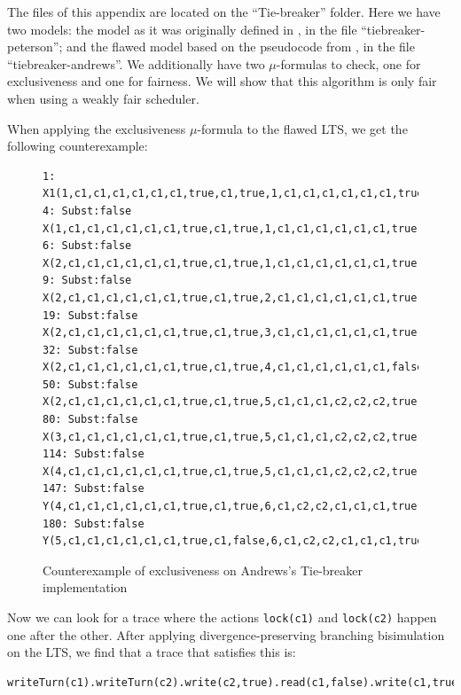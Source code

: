 \documentclass[11pt]{article}
\theoremstyle{definition}
\theoremstyle{plain}
\begin{document}
\begin{appendices}
The files of this appendix are located on the ``Tie-breaker'' folder. Here we have two models: the model as it was originally defined in \cite{Peterson1981115}, in the file ``tiebreaker-peterson''; and the flawed model based on the pseudocode from \cite{andrews2000foundations}, in the file ``tiebreaker-andrews''. We additionally have two $ \mu $-formulas to check, one for exclusiveness and one for fairness. We will show that this algorithm is only fair when using a weakly fair scheduler.

When applying the exclusiveness $ \mu$-formula to the flawed LTS, we get the following counterexample:

\begin{figure}[ht]
\begin{lstlisting}
1: X1(1,c1,c1,c1,c1,c1,c1,true,c1,true,1,c1,c1,c1,c1,c1,c1,true,c1,true,false,false,c1)
4: Subst:false   X(1,c1,c1,c1,c1,c1,c1,true,c1,true,1,c1,c1,c1,c1,c1,c1,true,c1,true,false,false,c1)
6: Subst:false   X(2,c1,c1,c1,c1,c1,c1,true,c1,true,1,c1,c1,c1,c1,c1,c1,true,c1,true,false,false,c1)
9: Subst:false   X(2,c1,c1,c1,c1,c1,c1,true,c1,true,2,c1,c1,c1,c1,c1,c1,true,c2,true,false,false,c2)
19: Subst:false   X(2,c1,c1,c1,c1,c1,c1,true,c1,true,3,c1,c1,c1,c1,c1,c1,true,c1,true,false,true,c2)
32: Subst:false   X(2,c1,c1,c1,c1,c1,c1,true,c1,true,4,c1,c1,c1,c1,c1,c1,false,c1,true,false,true,c2)
50: Subst:false   X(2,c1,c1,c1,c1,c1,c1,true,c1,true,5,c1,c1,c1,c2,c2,c2,true,c1,false,false,true,c2)
80: Subst:false   X(3,c1,c1,c1,c1,c1,c1,true,c1,true,5,c1,c1,c1,c2,c2,c2,true,c1,false,true,true,c2)
114: Subst:false   X(4,c1,c1,c1,c1,c1,c1,true,c1,true,5,c1,c1,c1,c2,c2,c2,true,c1,false,true,true,c2)
147: Subst:false   Y(4,c1,c1,c1,c1,c1,c1,true,c1,true,6,c1,c2,c2,c1,c1,c1,true,c1,false,true,true,c2)
180: Subst:false   Y(5,c1,c1,c1,c1,c1,c1,true,c1,false,6,c1,c2,c2,c1,c1,c1,true,c1,false,true,true,c2)
\end{lstlisting}
\caption{Counterexample of exclusiveness on Andrews's Tie-breaker implementation}
\end{figure}

Now we can look for a trace where the actions \texttt{lock(c1)} and \texttt{lock(c2)} happen one after the other. After applying divergence-preserving branching bisimulation on the LTS, we find that a trace that satisfies this is:

\begin{lstlisting}
writeTurn(c1).writeTurn(c2).write(c2,true).read(c1,false).write(c1,true).readTurn(c2).read(c2,true).readTurn(c2).lock(c1).lock(c2)
\end{lstlisting}


\end{appendices}
\end{document}
